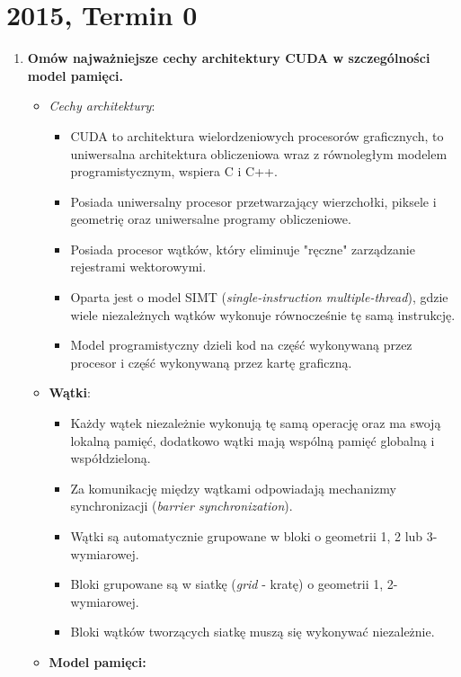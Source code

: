	\section{2015, Termin 0}
		\begin{enumerate}
			\item \textbf{Omów najważniejsze cechy architektury CUDA w szczególności model pamięci.}
			\begin{samepage}
				\begin{itemize}
					\item \emph{Cechy architektury}:
					\begin{itemize}
						\item CUDA to architektura wielordzeniowych procesorów graficznych, to uniwersalna architektura obliczeniowa wraz z równoległym modelem programistycznym, wspiera C i C++.
						\item Posiada uniwersalny procesor przetwarzający wierzchołki, piksele i geometrię oraz uniwersalne programy obliczeniowe.
						\item Posiada procesor wątków, który eliminuje "ręczne" zarządzanie rejestrami wektorowymi.
						\item Oparta jest o model SIMT (\emph{single-instruction multiple-thread}), gdzie wiele niezależnych wątków wykonuje równocześnie tę samą instrukcję.
						\item Model programistyczny dzieli kod na część wykonywaną przez procesor i część wykonywaną przez kartę graficzną.
					\end{itemize}
					\item \textbf{Wątki}:
					\begin{itemize}
						\item Każdy wątek niezależnie wykonują tę samą operację oraz ma swoją lokalną pamięć, dodatkowo wątki mają wspólną pamięć globalną i współdzieloną.
						\item Za komunikację między wątkami odpowiadają mechanizmy synchronizacji (\emph{barrier synchronization}).
						\item Wątki są automatycznie grupowane w bloki o geometrii 1, 2 lub 3-wymiarowej.
						\item Bloki grupowane są w siatkę (\emph{grid} - kratę) o geometrii 1, 2-wymiarowej.
						\item Bloki wątków tworzących siatkę muszą się wykonywać niezależnie.
					\end{itemize}
					\item \textbf{Model pamięci:}
					\begin{itemize}

\end{itemize}
\end{itemize}
\end{samepage}
\end{enumerate}
